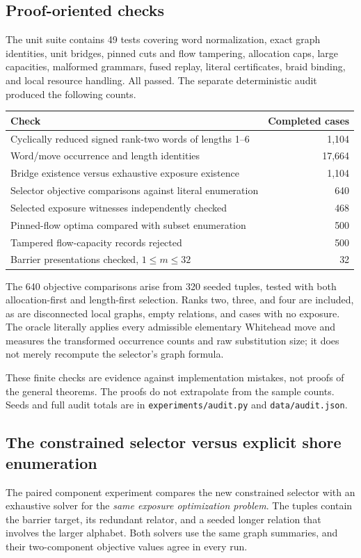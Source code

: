 \documentclass[11pt,letterpaper]{article}
\theoremstyle{definition}\newtheorem{definition}[theorem]{Definition}
\begin{document}
\subsection{Proof-oriented checks}
The unit suite contains 49 tests covering word normalization, exact graph identities, unit bridges, pinned cuts and flow tampering, allocation caps, large capacities, malformed grammars, fused replay, literal certificates, braid binding, and local resource handling. All passed. The separate deterministic audit produced the following counts.

\begin{center}
\begin{tabular}{lr}
\toprule Check & Completed cases\\\midrule
Cyclically reduced signed rank-two words of lengths 1--6 & 1,104\\
Word/move occurrence and length identities & 17,664\\
Bridge existence versus exhaustive exposure existence & 1,104\\
Selector objective comparisons against literal enumeration & 640\\
Selected exposure witnesses independently checked & 468\\
Pinned-flow optima compared with subset enumeration & 500\\
Tampered flow-capacity records rejected & 500\\
Barrier presentations checked, $1\le m\le32$ & 32\\\bottomrule
\end{tabular}
\end{center}
The 640 objective comparisons arise from 320 seeded tuples, tested with both allocation-first and length-first selection. Ranks two, three, and four are included, as are disconnected local graphs, empty relations, and cases with no exposure. The oracle literally applies every admissible elementary Whitehead move and measures the transformed occurrence counts and raw substitution size; it does not merely recompute the selector's graph formula.

These finite checks are evidence against implementation mistakes, not proofs of the general theorems. The proofs do not extrapolate from the sample counts. Seeds and full audit totals are in \texttt{experiments/audit.py} and \texttt{data/audit.json}.

\subsection{The constrained selector versus explicit shore enumeration}
The paired component experiment compares the new constrained selector with an exhaustive solver for the \emph{same exposure optimization problem}. The tuples contain the barrier target, its redundant relator, and a seeded longer relation that involves the larger alphabet. Both solvers use the same graph summaries, and their two-component objective values agree in every run.
\end{document}
